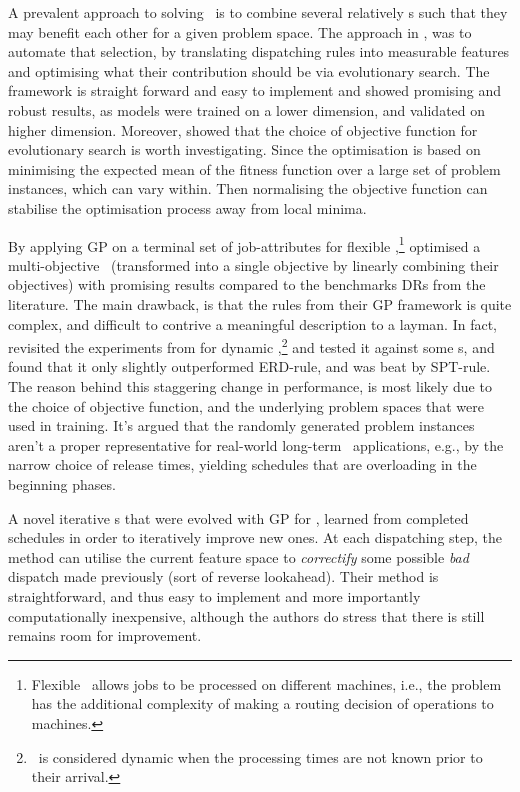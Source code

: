 \documentclass[smallextended]{svjour3}
\begin{document}
A prevalent approach to solving \JSP\ is to combine several relatively \sdr s 
such that they may benefit each other for a given problem space. 
The approach in \cite{InRu14}, was to automate that selection, by 
translating dispatching rules into measurable features and optimising what 
their contribution should be via evolutionary search. The framework is straight 
forward and easy to implement and showed promising and robust results, 
as models were trained on a lower dimension, and validated on higher dimension. 
Moreover, \cite{InRu14} showed that the choice of objective 
function  for evolutionary search is worth investigating. Since the 
optimisation is based on minimising the expected mean of the fitness function 
over a large set of problem instances, which can vary within. Then normalising 
the objective function can stabilise the optimisation process away from local 
minima. 

By applying GP on a terminal set of job-attributes for flexible \jsp,\footnote{
    Flexible \jsp\ allows jobs to be processed on different machines, i.e., the 
    problem has the additional complexity of making a routing decision of 
    operations to machines.} 
\cite{Tay08} optimised a multi-objective \jsp~(transformed into a single 
objective by linearly combining their objectives) with promising results 
compared to the benchmarks DRs from the literature.
The main drawback, is that the rules from their GP framework is quite complex, 
and difficult to contrive a meaningful description to a layman.
In fact, \cite{Hildebrandt2010} revisited the experiments from \cite{Tay08} for 
dynamic \jsp,\footnote{\Jsp\ is considered dynamic when the processing times 
are not known prior to their arrival.} and tested it against some \sdr s, and 
found that it only slightly outperformed ERD-rule, and was beat by SPT-rule. 
The reason behind this staggering change in performance, is most likely due to 
the choice of objective function, and the underlying problem spaces that were 
used in training. 
It's argued that the randomly generated problem instances aren't a 
proper representative for real-world long-term \jsp\ applications, e.g., by the 
narrow choice of release times, yielding schedules that are overloading in the 
beginning phases.

A novel iterative \dr s that were evolved with GP for \JSP, \cite{Nguyen13} 
learned from completed schedules in order to iteratively improve new ones. 
At each dispatching step, the method can utilise the current feature space to 
\emph{correctify} some possible \emph{bad} dispatch made previously (sort of 
reverse lookahead). Their method is straightforward, and thus easy to 
implement and more importantly computationally inexpensive, although the 
authors do stress that there is still remains room for improvement.
\end{document}
